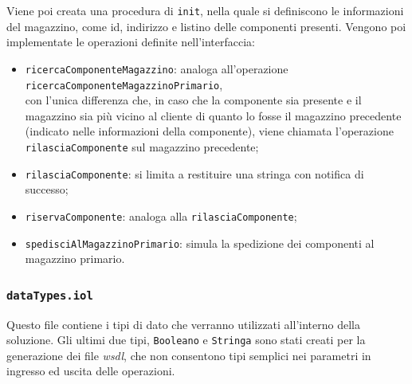 Viene poi creata una procedura di {\tt init}, nella quale si definiscono
le informazioni del magazzino, come id, indirizzo e listino delle
componenti presenti.
Vengono poi implementate le operazioni definite nell'interfaccia:
\begin{itemize}
  \item {\tt ricercaComponenteMagazzino}: \linebreak
  analoga all'operazione {\tt ricercaComponenteMagazzinoPrimario},\\ con
  l'unica differenza che, in caso che la componente sia presente e il
  \linebreak
  magazzino sia pi\`u vicino al cliente di quanto lo fosse il magazzino
  precedente (indicato nelle informazioni della componente), viene
  chiamata \linebreak l'operazione {\tt rilasciaComponente} sul
  magazzino precedente;
  \item {\tt rilasciaComponente}: si limita a restituire una stringa con
  notifica di successo;
  \item {\tt riservaComponente}: analoga alla {\tt rilasciaComponente};
  \item {\tt spedisciAlMagazzinoPrimario}: simula la spedizione dei
  componenti al magazzino primario.
\end{itemize}

\subsubsection*{\tt dataTypes.iol}
Questo file contiene i tipi di dato che verranno utilizzati all'interno
della soluzione.
Gli ultimi due tipi, {\tt Booleano} e {\tt Stringa} sono stati creati
per la generazione dei file \textit{wsdl}, che non consentono tipi
semplici nei parametri in ingresso ed uscita delle operazioni.

